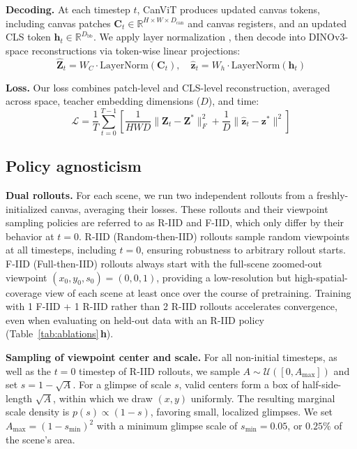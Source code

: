 \documentclass{article}
\newcommand{\Dcan}{D_{\text{can}}}
\newcommand{\Dbb}{D_{\text{bb}}}
\newcommand{\Ztgt}{\mathbf{Z}^*}
\newcommand{\ztgt}{\mathbf{z}^*}
\newcommand{\Ztrecon}{\hat{\mathbf{Z}}_t}
\newcommand{\ztrecon}{\hat{\mathbf{z}}_t}
\begin{document}
\textbf{Decoding.} At each timestep $t$,
CanViT produces updated canvas tokens,
including canvas patches $\mathbf{C}_t \in \mathbb{R}^{H \times W \times \Dcan}$ and canvas registers,
and an updated CLS token $\mathbf{h}_t \in \mathbb{R}^{\Dbb}$.
We apply layer normalization \cite{baLayerNormalization2016},
then decode into DINOv3-space reconstructions via token-wise linear projections:
\begin{equation}
  \Ztrecon = W_C \cdot \text{LayerNorm}(\mathbf{C}_t), \quad
  \ztrecon = W_h \cdot \text{LayerNorm}(\mathbf{h}_t)
\end{equation}

\textbf{Loss.} Our loss combines patch-level and CLS-level reconstruction, averaged across space, teacher embedding dimensions ($D$), and time:
\begin{equation}
  \mathcal{L} = \frac{1}{T} \sum_{t=0}^{T-1}
  \left[
    \frac{1}{HWD} \|\Ztrecon - \Ztgt\|_F^2 + \frac{1}{D} \|\ztrecon - \ztgt\|^2
  \right]
\end{equation}


\subsection{Policy agnosticism}
\label{subsec:policy-agnosticism}

\textbf{Dual rollouts.}
For each scene, we run two independent rollouts from a freshly-initialized canvas, averaging their losses.
These rollouts and their viewpoint sampling policies are referred to as R-IID and F-IID,
which only differ by their behavior at $t=0$.
R-IID (Random-then-IID) rollouts sample random viewpoints at all timesteps, including $t=0$,
ensuring robustness to arbitrary rollout starts.
F-IID (Full-then-IID) rollouts always start with the full-scene zoomed-out viewpoint $(x_0,y_0,s_0) = (0,0,1)$,
providing a low-resolution but high-spatial-coverage view of each scene at least once over the course of pretraining.
Training with 1 F-IID + 1 R-IID rather than 2 R-IID rollouts accelerates convergence,
even when evaluating on held-out data with an R-IID policy (Table~\ref{tab:ablations}\,\textbf{h}).

\textbf{Sampling of viewpoint center and scale.}
For all non-initial timesteps, as well as the $t = 0$ timestep of R-IID rollouts,
we sample $A \sim \mathcal{U}([0, A_{\max}])$ and set $s = 1 - \sqrt{A}$.
For a glimpse of scale $s$,
valid centers form a box of half-side-length $\sqrt{A}$,
within which we draw $(x, y)$ uniformly.
The resulting marginal scale density is $p(s) \propto (1 - s)$,
favoring small, localized glimpses.
We set $A_{\max} = (1 - s_{\min})^2$ with a minimum glimpse scale of $s_{\min} = 0.05$, or $0.25\%$ of the scene's area.
\end{document}
